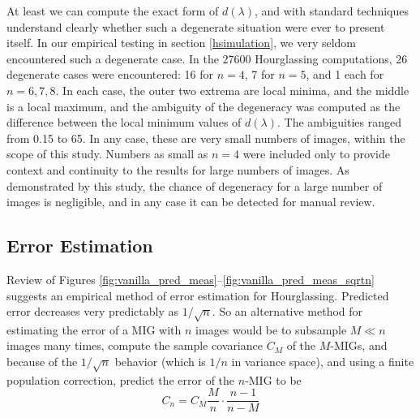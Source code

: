 \documentclass[10pt]{amsart}
\begin{document}

At least we can compute the exact form of $d(\lambda)$, and with standard
techniques understand clearly whether such a degenerate situation were ever to
present itself. In our empirical testing in section \ref{hsimulation}, we very
seldom encountered such a degenerate case. In the 27600 Hourglassing
computations, 26 degenerate cases were encountered: 16 for $n=4$, 7 for $n=5$,
and 1 each for $n=6,7,8$. In each case, the outer two extrema are local minima,
and the middle is a local maximum, and the ambiguity of the degeneracy was
computed as the difference between the local minimum values of $d(\lambda)$. The
ambiguities ranged from 0.15 to 65. In any case, these are very small numbers of
images, within the scope of this study. Numbers as small as $n=4$ were included
only to provide context and continuity to the results for large numbers of
images. As demonstrated by this study, the chance of degeneracy for a large
number of images is negligible, and in any case it can be detected for manual
review.


\subsection{Error Estimation}
Review of Figures \ref{fig:vanilla_pred_meas}--\ref{fig:vanilla_pred_meas_sqrtn}
suggests an empirical meth\-od of error estimation for Hourglassing. Predicted
error decreases very predictably as $1/\sqrt n$. So an alternative method for
estimating the error of a MIG with $n$ images would be to subsample $M \ll n$
images many times, compute the sample covariance $C_M$ of the $M$-MIGs, and
because of the $1/\sqrt n$ behavior (which is $1/n$ in variance space), and
using a finite population correction, predict the error of the $n$-MIG to
be $$C_n=C_M\frac{M}{n}\cdot\frac{n-1}{n-M}$$
\end{document}
